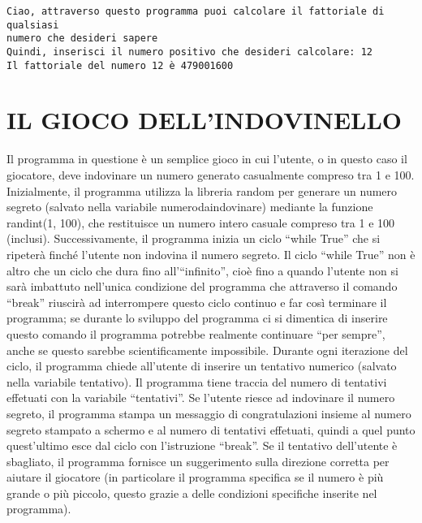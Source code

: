 \documentclass[11pt]{article}
\begin{document}
    \begin{Verbatim}[commandchars=\\\{\}]
Ciao, attraverso questo programma puoi calcolare il fattoriale di qualsiasi
numero che desideri sapere
Quindi, inserisci il numero positivo che desideri calcolare: 12
Il fattoriale del numero 12 è 479001600
    \end{Verbatim}

    \section{IL GIOCO DELL'INDOVINELLO}\label{il-gioco-dellindovinello}

    Il programma in questione è un semplice gioco in cui l'utente, o in
questo caso il giocatore, deve indovinare un numero generato casualmente
compreso tra 1 e 100. Inizialmente, il programma utilizza la libreria
random per generare un numero segreto (salvato nella variabile
numerodaindovinare) mediante la funzione randint(1, 100), che
restituisce un numero intero casuale compreso tra 1 e 100 (inclusi).
Successivamente, il programma inizia un ciclo ``while True'' che si
ripeterà finché l'utente non indovina il numero segreto. Il ciclo
``while True'' non è altro che un ciclo che dura fino all'``infinito'',
cioè fino a quando l'utente non si sarà imbattuto nell'unica condizione
del programma che attraverso il comando ``break'' riuscirà ad
interrompere questo ciclo continuo e far così terminare il programma; se
durante lo sviluppo del programma ci si dimentica di inserire questo
comando il programma potrebbe realmente continuare ``per sempre'', anche
se questo sarebbe scientificamente impossibile. Durante ogni iterazione
del ciclo, il programma chiede all'utente di inserire un tentativo
numerico (salvato nella variabile tentativo). Il programma tiene traccia
del numero di tentativi effetuati con la variabile ``tentativi''. Se
l'utente riesce ad indovinare il numero segreto, il programma stampa un
messaggio di congratulazioni insieme al numero segreto stampato a
schermo e al numero di tentativi effetuati, quindi a quel punto
quest'ultimo esce dal ciclo con l'istruzione ``break''. Se il tentativo
dell'utente è sbagliato, il programma fornisce un suggerimento sulla
direzione corretta per aiutare il giocatore (in particolare il programma
specifica se il numero è più grande o più piccolo, questo grazie a delle
condizioni specifiche inserite nel programma).
\end{document}
